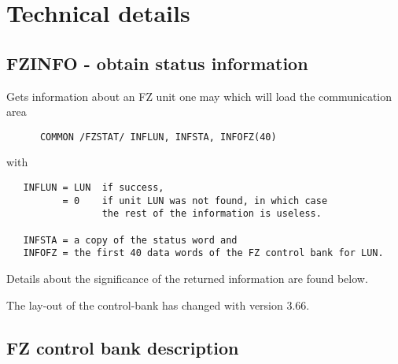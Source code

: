 \chapter{Technical details}

\section{FZINFO - obtain status information}


Gets information about an FZ unit  one may
which will load the communication area

\begin{verbatim}
      COMMON /FZSTAT/ INFLUN, INFSTA, INFOFZ(40)
\end{verbatim}

with

\begin{verbatim}
   INFLUN = LUN  if success,
          = 0    if unit LUN was not found, in which case
                 the rest of the information is useless.

   INFSTA = a copy of the status word and
   INFOFZ = the first 40 data words of the FZ control bank for LUN.
\end{verbatim}

Details about the significance of the returned information are
found below.


The lay-out of the control-bank has changed with version 3.66.

\section{FZ control bank description}

